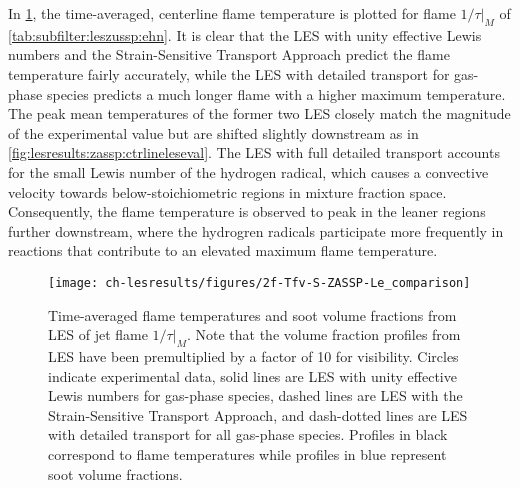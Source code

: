 In \cref{fig:lesresults:ssta:f2lecomparison}, the time-averaged, centerline flame temperature is plotted for flame $1/\tau|_M$ of \cref{tab:subfilter:leszussp:ehn}. It is clear that the LES with unity effective Lewis numbers and the Strain-Sensitive Transport Approach predict the flame temperature fairly accurately, while the LES with detailed transport for gas-phase species predicts a much longer flame with a higher maximum temperature. The peak mean temperatures of the former two LES closely match the magnitude of the experimental value but are shifted slightly downstream as in \cref{fig:lesresults:zassp:ctrlineleseval}. The LES with full detailed transport accounts for the small Lewis number of the hydrogen radical, which causes a convective velocity towards below-stoichiometric regions in mixture fraction space. Consequently, the flame temperature is observed to peak in the leaner regions further downstream, where the hydrogren radicals participate more frequently in reactions that contribute to an elevated maximum flame temperature. %

\begin{figure}[H]
  \centering
  \texttt{[image: ch-lesresults/figures/2f-Tfv-S-ZASSP-Le\_comparison]}
  \caption[Centerline \texorpdfstring{$\langle T \rangle$}{<T>} \& \texorpdfstring{$\langle f_V \rangle$}{<fV>} from LES of Flame \texorpdfstring{$1/\tau|_M$}{1/t|M} with Various Transport Approaches]{Time-averaged flame temperatures and soot volume fractions from LES of jet flame $1/\tau|_M$. Note that the volume fraction profiles from LES have been premultiplied by a factor of 10 for visibility. Circles indicate experimental data, solid lines are LES with unity effective Lewis numbers for gas-phase species, dashed lines are LES with the Strain-Sensitive Transport Approach, and dash-dotted lines are LES with detailed transport for all gas-phase species. Profiles in black correspond to flame temperatures while profiles in blue represent soot volume fractions.}
  \label{fig:lesresults:ssta:f2lecomparison}
\end{figure}

